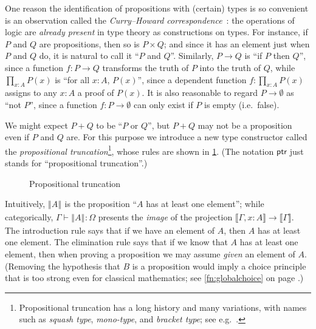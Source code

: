 \documentclass[10pt]{article}
\let\jdeq\equiv
\def\ty{\;\mathsf{type}}
\def\m#1{\llbracket#1\rrbracket}
\def\types{\vdash}
\def\equiv{\mathsf{Equiv}}
\numberwithin{equation}{section}
\newcommand{\trunc}[2]{\mathopen{}\left\Vert #2\right\Vert_{#1}\mathclose{}}
\newcommand{\tproj}[3][]{\mathopen{}\left|#3\right|_{#2}^{#1}\mathclose{}}
\newcommand{\brck}[1]{\trunc{}{#1}}
\newcommand{\bproj}[1]{\tproj{}{#1}}
\begin{document}
One reason the identification of propositions with (certain) types is so con\-venient is an observation called the \emph{Curry--Howard correspondence}~\cite{curry:curry-howard,howard:curry-howard,martinlof:itt-pred,wadler:pat}: the operations of logic are \emph{already present} in type theory as constructions on types.
For instance, if $P$ and $Q$ are propositions, then so is $P\times Q$; and since it has an element just when $P$ and $Q$ do, it is natural to call it ``$P$ and $Q$''. %
Similarly, $P\to Q$ is ``if $P$ then $Q$'', since a function $f:P\to Q$ transforms the truth of $P$ into the truth of $Q$, while $\prod_{x:A} P(x)$ is ``for all $x:A$, $P(x)$'', since a dependent function $f:\prod_{x:A} P(x)$ assigns to any $x:A$ a proof of $P(x)$.
It is also reasonable to regard $P\to \emptyset$ as ``not $P$'', since a function $f:P\to \emptyset$ can only exist if $P$ is empty (i.e.\ false).

We might expect $P+Q$ to be ``$P$ or $Q$'', but $P+Q$ may not be a proposition even if $P$ and $Q$ are.
For this purpose we introduce a new type constructor called the \emph{propositional truncation}\footnote{Propositional truncation has a long history and many variations, with names such as \emph{squash type}, \emph{mono-type}, and \emph{bracket type}; see e.g.~\cite{nuprlbook,mendler:quotient-types,maietti:tt-hpretop,ab:bracket-types,hottbook}.}, whose rules are shown in \cref{fig:brck}.
(The notation $\mathsf{ptr}$ just stands for ``propositional truncation''.)
\begin{figure}
  \centering
  \caption{Propositional truncation}
  \label{fig:brck}
\end{figure}
Intuitively, $\brck A$ is the proposition ``$A$ has at least one element''; while categorically, $\Gamma\types \brck A: \Omega$ presents the \emph{image} of the projection $\m{\Gamma,x:A} \to \m{\Gamma}$.
The introduction rule says that if we have an element of $A$, then $A$ has at least one element.
The elimination rule says that if we know that $A$ has at least one element, then when proving a proposition we may assume \emph{given} an element of $A$.
(Removing the hypothesis that $B$ is a proposition would imply a choice principle that is too strong even for classical mathematics; see \cref{fn:globalchoice} on page \pageref{fn:globalchoice}.)
\end{document}
